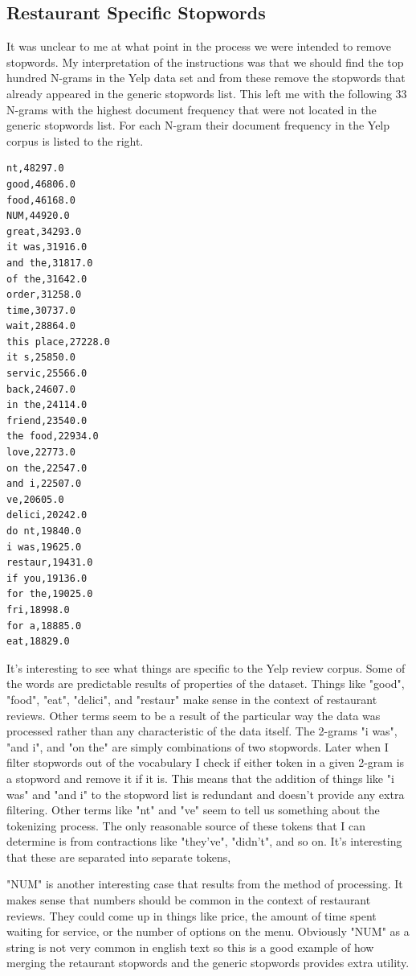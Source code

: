 \documentclass[paper=a4, fontsize=11pt]{jhwhw} %
\begin{document}
\subsection{Restaurant Specific Stopwords}
It was unclear to me at what point in the process we were intended to remove stopwords. My interpretation of the instructions was that we should find the top hundred N-grams in the Yelp data set and from these remove the stopwords that already appeared in the generic stopwords list. This left me with the following 33 N-grams with the highest document frequency that were not located in the generic stopwords list. For each N-gram their document frequency in the Yelp corpus is listed to the right. 
\begin{verbatim}
nt,48297.0
good,46806.0
food,46168.0
NUM,44920.0
great,34293.0
it was,31916.0
and the,31817.0
of the,31642.0
order,31258.0
time,30737.0
wait,28864.0
this place,27228.0
it s,25850.0
servic,25566.0
back,24607.0
in the,24114.0
friend,23540.0
the food,22934.0
love,22773.0
on the,22547.0
and i,22507.0
ve,20605.0
delici,20242.0
do nt,19840.0
i was,19625.0
restaur,19431.0
if you,19136.0
for the,19025.0
fri,18998.0
for a,18885.0
eat,18829.0
\end{verbatim}

It's interesting to see what things are specific to the Yelp review corpus. Some of the words are predictable results of properties of the dataset. Things like "good", "food", "eat", "delici", and "restaur" make sense in the context of restaurant reviews. Other terms seem to be a result of the particular way the data was processed rather than any characteristic of the data itself. The 2-grams "i was", "and i", and "on the" are simply combinations of two stopwords. Later when I filter stopwords out of the vocabulary I check if either token in a given 2-gram is a stopword and remove it if it is. This means that the addition of things like "i was" and "and i" to the stopword list is redundant and doesn't provide any extra filtering. Other terms like "nt" and "ve" seem to tell us something about the tokenizing process. The only reasonable source of these tokens that I can determine is from contractions like "they've", "didn't", and so on. It's interesting that these are separated into separate tokens, 

"NUM" is another interesting case that results from the method of processing. It makes sense that numbers should be common in the context of restaurant reviews. They could come up in things like price, the amount of time spent waiting for service, or the number of options on the menu. Obviously "NUM" as a string is not very common in english text so this is a good example of how merging the retaurant stopwords and the generic stopwords provides extra utility. 
\end{document}
